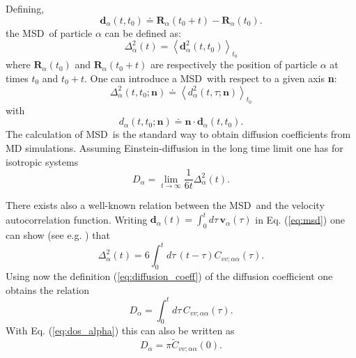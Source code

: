\documentclass[a4paper,11pt]{article}
\begin{document}
Defining,
\begin{equation}
\textbf{d}_{\alpha}(t,t_0) \doteq \textbf{R}_\alpha(t_0 + t) - \textbf{R}_\alpha(t_0).
\end{equation}
the \gls{MSD}\ of particle $\alpha$ can be defined as:
\begin{equation}
\label{eq:msd}
\Delta^2_\alpha(t) = \left\langle \textbf{d}^2_\alpha(t,t_0) \right\rangle_{t_0}
\end{equation}
where $\textbf{R}_\alpha(t_0)$ and $\textbf{R}_\alpha(t_0 + t)$ are respectively the position of particle $\alpha$ at 
times $t_0$ and $t_0+t$.
One can introduce a \gls{MSD}\ with respect to a given axis \textbf{n}:
\begin{equation}
\label{eq:msd_n}
\Delta^2_\alpha(t,t_0;\textbf{n}) \doteq \left\langle
d^2_\alpha(t,\tau;\textbf{n})\right\rangle_{t_0}
\end{equation}
with
\begin{equation}
d_{\alpha}(t,t_0;\textbf{n}) \doteq \textbf{n}\cdot \textbf{d}_{\alpha}(t,t_0).
\end{equation}
The calculation of \gls{MSD}\ is the standard way
to obtain diffusion coefficients from \gls{MD} simulations. Assuming
Einstein-diffusion in the long time limit one has for isotropic
systems
\begin{equation}
\label{eq:diffusion_coeff}
D_\alpha = \lim_{t\to\infty} \frac{1}{6t} \Delta^2_\alpha(t).
\end{equation}

There exists also a well-known relation between the \gls{MSD}\ and the velocity 
autocorrelation function. Writing $\textbf{d}_\alpha(t) = \int_{0}^{t}d\tau\,\textbf{v}_\alpha(\tau)$  in Eq.
(\ref{eq:msd}) one can show (see e.g. \cite{Yip:1980}) that 
\begin{equation}
\label{eq:msd_vacf}
\Delta^2_\alpha(t) = 6 \int_{0}^{t}d\tau\,(t - \tau)
C_{vv ; \alpha\alpha}(\tau).
\end{equation}
Using now the definition (\ref{eq:diffusion_coeff}) of the diffusion coefficient one
obtains the relation
\begin{equation}
\label{eq:d_vacf}
D_\alpha = \int_{0}^{t}d\tau\, C_{vv ; \alpha\alpha}(\tau).
\end{equation}
With Eq. (\ref{eq:dos_alpha}) this can  also be written as
\begin{equation}
\label{eq:d_dos}
D_\alpha = \pi \tilde C_{vv ; \alpha\alpha}(0).
\end{equation}
\end{document}
